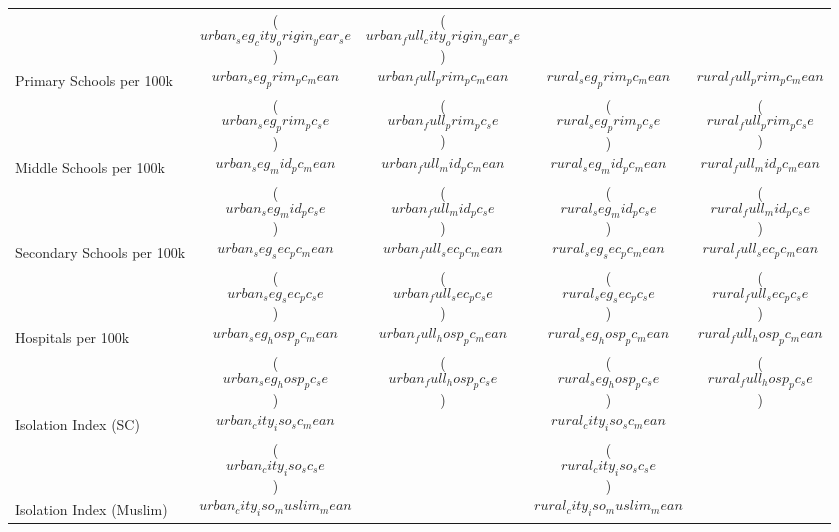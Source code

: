{\begin{tabular}{lcccc}
                             & ($$urban_seg_city_origin_year_se$$)   & ($$urban_full_city_origin_year_se$$)  &                                      &                                       \\
Primary Schools per 100k     & $$urban_seg_prim_pc_mean$$            & $$urban_full_prim_pc_mean$$           & $$rural_seg_prim_pc_mean$$           & $$rural_full_prim_pc_mean$$           \\
                             & ($$urban_seg_prim_pc_se$$)            & ($$urban_full_prim_pc_se$$)           & ($$rural_seg_prim_pc_se$$)           & ($$rural_full_prim_pc_se$$)           \\
Middle Schools per 100k      & $$urban_seg_mid_pc_mean$$             & $$urban_full_mid_pc_mean$$            & $$rural_seg_mid_pc_mean$$            & $$rural_full_mid_pc_mean$$            \\
                             & ($$urban_seg_mid_pc_se$$)             & ($$urban_full_mid_pc_se$$)            & ($$rural_seg_mid_pc_se$$)            & ($$rural_full_mid_pc_se$$)            \\
Secondary Schools per 100k   & $$urban_seg_sec_pc_mean$$             & $$urban_full_sec_pc_mean$$            & $$rural_seg_sec_pc_mean$$            & $$rural_full_sec_pc_mean$$            \\
                             & ($$urban_seg_sec_pc_se$$)             & ($$urban_full_sec_pc_se$$)            & ($$rural_seg_sec_pc_se$$)            & ($$rural_full_sec_pc_se$$)            \\
Hospitals per 100k           & $$urban_seg_hosp_pc_mean$$            & $$urban_full_hosp_pc_mean$$           & $$rural_seg_hosp_pc_mean$$           & $$rural_full_hosp_pc_mean$$           \\
& ($$urban_seg_hosp_pc_se$$)            & ($$urban_full_hosp_pc_se$$)           & ($$rural_seg_hosp_pc_se$$)           & ($$rural_full_hosp_pc_se$$)           \\
\hline
Isolation Index (SC)         & $$urban_city_iso_sc_mean$$            &                                       & $$rural_city_iso_sc_mean$$           &                                       \\
                             & ($$urban_city_iso_sc_se$$)            &                                       & ($$rural_city_iso_sc_se$$)           &                                       \\
Isolation Index (Muslim)     & $$urban_city_iso_muslim_mean$$        &                                       & $$rural_city_iso_muslim_mean$$       &                                       \\

\end{tabular}}
